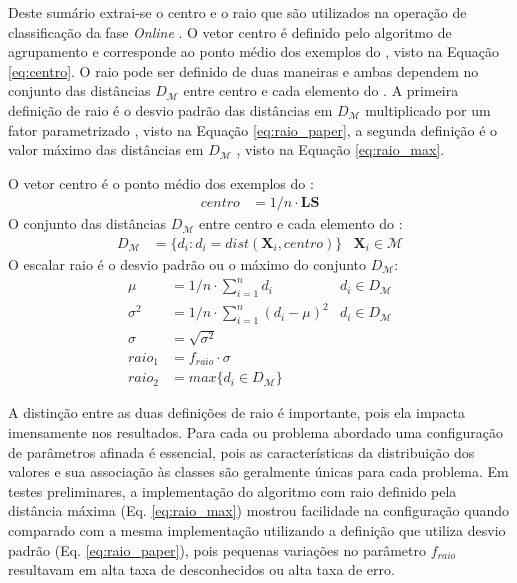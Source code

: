 
Deste sumário extrai-se o centro e o raio que são utilizados na operação de
classificação da fase \emph{Online} \cite{Faria2016minas}.
O vetor centro é definido pelo algoritmo de agrupamento e corresponde ao
ponto médio dos exemplos do \mcluster, visto na Equação \ref{eq:centro}.
O raio pode ser definido de duas maneiras e ambas dependem no conjunto das
distâncias $D_\mathcal{M}$ entre centro e cada elemento do \mcluster.
A primeira definição de raio é o desvio padrão das distâncias em $D_\mathcal{M}$
multiplicado por um fator parametrizado \cite{Faria2016minas}, visto na Equação
\ref{eq:raio_paper}, a segunda definição é o valor máximo das distâncias em
$D_\mathcal{M}$ \cite{Faria2013source}, visto na Equação \ref{eq:raio_max}.

\begin{definition}
  O vetor centro é o ponto médio dos exemplos do \mcluster:
  \begin{align}
    centro    &= 1/n \cdot \mathbf{LS} \label{eq:centro}
  \end{align}
  O conjunto das distâncias $D_\mathcal{M}$ entre centro e cada elemento do \mcluster:
  \begin{align}
    D_\mathcal{M}  &= \{ d_i : d_i = dist(\mathbf{X}_i, centro) \} & \mathbf{X}_i \in \mathcal{M} \nonumber
  \end{align}
  O escalar raio é o desvio padrão ou o máximo do conjunto $D_\mathcal{M}$:
  \begin{align}
    \mu       &= 1/n \cdot \sum_{i=1}^{n} d_i             & d_i \in D_\mathcal{M} \nonumber \\
    \sigma^2  &= 1/n \cdot \sum_{i=1}^{n} (d_i - \mu) ^2  & d_i \in D_\mathcal{M} \nonumber \\
    \sigma    &= \sqrt{ \sigma^2 }                        & \nonumber \\
    raio_1    &= f_{raio} \cdot \sigma                    & \label{eq:raio_paper}\\
    raio_2    &= max\{ d_i \in D_\mathcal{M} \}           & \label{eq:raio_max}
  \end{align}
\end{definition}


A distinção entre as duas definições de raio é importante, pois ela impacta
imensamente nos resultados.
Para cada \dataset ou problema abordado uma configuração de parâmetros afinada
é essencial, pois as características da distribuição dos valores e sua associação
às classes são geralmente únicas para cada problema.
Em testes preliminares, a implementação do algoritmo \minas com raio definido
pela distância máxima (Eq. \ref{eq:raio_max}) mostrou facilidade na configuração quando
comparado com a mesma implementação utilizando a definição que utiliza desvio
padrão (Eq. \ref{eq:raio_paper}), pois pequenas variações no parâmetro $f_{raio}$
resultavam em alta taxa de desconhecidos ou alta taxa de erro.

